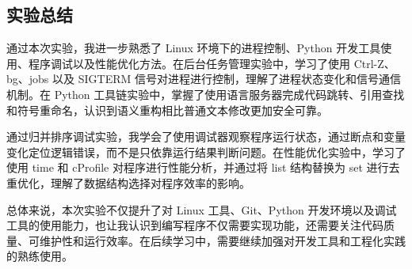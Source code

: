 \documentclass[UTF8,a4paper,11pt]{ctexart}
\begin{document}
\subsection{实验总结}

通过本次实验，我进一步熟悉了 Linux 环境下的进程控制、Python 开发工具使用、程序调试以及性能优化方法。在后台任务管理实验中，学习了使用 Ctrl-Z、bg、jobs 以及 SIGTERM 信号对进程进行控制，理解了进程状态变化和信号通信机制。在 Python 工具链实验中，掌握了使用语言服务器完成代码跳转、引用查找和符号重命名，认识到语义重构相比普通文本修改更加安全可靠。

通过归并排序调试实验，我学会了使用调试器观察程序运行状态，通过断点和变量变化定位逻辑错误，而不是只依靠运行结果判断问题。在性能优化实验中，学习了使用 time 和 cProfile 对程序进行性能分析，并通过将 list 结构替换为 set 进行去重优化，理解了数据结构选择对程序效率的影响。

总体来说，本次实验不仅提升了对 Linux 工具、Git、Python 开发环境以及调试工具的使用能力，也让我认识到编写程序不仅需要实现功能，还需要关注代码质量、可维护性和运行效率。在后续学习中，需要继续加强对开发工具和工程化实践的熟练使用。
\end{document}
